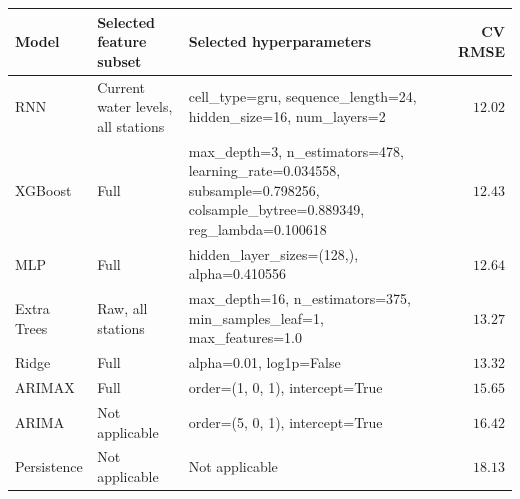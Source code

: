 \begin{tabularx}{\textwidth}{@{}lXXr@{}}
\toprule
\textbf{Model} & \textbf{Selected feature subset} & \textbf{Selected hyperparameters} & \textbf{CV RMSE} \\
\midrule
RNN & Current water levels, all stations & cell\_type=gru, sequence\_length=24, hidden\_size=16, num\_layers=2 & $12.02$ \\
\addlinespace
XGBoost & Full & max\_depth=3, n\_estimators=478, learning\_rate=0.034558, subsample=0.798256, colsample\_bytree=0.889349, reg\_lambda=0.100618 & $12.43$ \\
\addlinespace
MLP & Full & hidden\_layer\_sizes=(128,), alpha=0.410556 & $12.64$ \\
\addlinespace
Extra Trees & Raw, all stations & max\_depth=16, n\_estimators=375, min\_samples\_leaf=1, max\_features=1.0 & $13.27$ \\
\addlinespace
Ridge & Full & alpha=0.01, log1p=False & $13.32$ \\
\addlinespace
ARIMAX & Full & order=(1, 0, 1), intercept=True & $15.65$ \\
\addlinespace
ARIMA & Not applicable & order=(5, 0, 1), intercept=True & $16.42$ \\
\addlinespace
Persistence & Not applicable & Not applicable & $18.13$ \\
\bottomrule
\end{tabularx}
